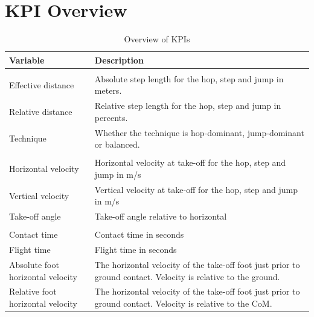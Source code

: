 \documentclass[]{scrreprt}
\begin{document}
\clearpage

\hypertarget{kpi-overview}{%
\chapter{KPI Overview}\label{kpi-overview}}

\begin{table}[!h]

\caption{\label{tab:kpi-overview}Overview of KPIs}
\centering
\begin{tabular}[t]{>{\raggedright\arraybackslash}p{15em}|l}
\hline
Variable & Description\\
\hline
\multicolumn{2}{l}{\textbf{Phase ratio}}\\
\hline
\hspace{1em}Effective distance & Absolute step length for the hop, step and jump in meters.\\
\hline
\hspace{1em}Relative distance & Relative step length for the hop, step and jump in percents.\\
\hline
\hspace{1em}Technique & Whether the technique is hop-dominant, jump-dominant or balanced.\\
\hline
\multicolumn{2}{l}{\textbf{Velocities}}\\
\hline
\hspace{1em}Horizontal velocity & Horizontal velocity at take-off for the hop, step and jump in m/s\\
\hline
\hspace{1em}Vertical velocity & Vertical velocity at take-off for the hop, step and jump in m/s\\
\hline
\hspace{1em}Take-off angle & Take-off angle relative to horizontal\\
\hline
\multicolumn{2}{l}{\textbf{Take-off leg}}\\
\hline
\hspace{1em}Contact time & Contact time in seconds\\
\hline
\hspace{1em}Flight time & Flight time in seconds\\
\hline
\hspace{1em}Absolute foot horizontal velocity & The horizontal velocity of the take-off foot just prior to ground contact. Velocity is relative to the ground.\\
\hline
\hspace{1em}Relative foot horizontal velocity & The horizontal velocity of the take-off foot just prior to ground contact. Velocity is relative to the CoM.\\

\end{tabular}
\end{table}
\end{document}
